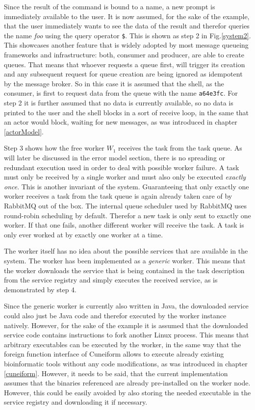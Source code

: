Since the result of the command is bound to a name, a new
prompt is immediately available to the user. It is now assumed,
for the sake of the example, that the user immediately wants to
see the data of the result and therefor queries the name
\textit{foo} using the query operator \texttt{\$}. This is
shown as step 2 in Fig.\ref{system2}. This showcases another
feature that is widely adopted by most message queueing
frameworks and infrastructure: both, consumer and producer,
are able to create queues. That means that whoever requests
a queue first, will trigger its creation and any subsequent
request for queue creation are being ignored as idempotent
by the message broker. So in this case it is assumed that
the shell, as the consumer, is first to request data from the
queue with the name \texttt{a64e3fc}. For step 2 it is further
assumed that no data is currently available, so no data is
printed to the user and the shell blocks in a sort of
receive loop, in the same that an actor would block, waiting
for new messages, as was introduced in chapter \ref{actorModel}.
\newline

Step 3 shows how the free worker $W_{1}$ receives the task from
the task queue. As will later be discussed in the error model
section, there is no spreading or redundant execution used in
order to deal with possible worker failure. A task must only
be received by a single worker and must also only be executed
\textit{exactly once}. This is another invariant of the system.
Guaranteeing that only exactly one worker receives a task
from the task queue is again already taken care of by RabbitMQ out
of the box. The internal queue scheduler used by RabbitMQ
uses round-robin scheduling by default. Therefor a new task
is only sent to exactly one worker. If that one fails, another
different worker will receive the task. A task is only ever
worked at by exactly one worker at a time.

The worker itself has no idea about the possible services
that are available in the system. The worker has been implemented
as a \textit{generic} worker. This means that the worker downloads
the service that is being contained in the task description from
the service registry and simply executes the received service, as
is demonstrated by step 4.

Since the generic worker is currently also written in Java,
the downloaded service could also just be Java code and therefor
executed by the worker instance natively. However, for the sake
of the example it is assumed that the downloaded service code
contains instructions to fork another Linux process. This means
that arbitrary executables can be executed by the worker, in
the same way that the foreign function interface of Cuneiform
allows to execute already existing bioinformatic tools without
any code modifications, as was introduced in chapter \ref{cuneiform}.
However, it needs to be said, that the current implementation
assumes that the binaries referenced are
already pre-installed on the worker node. However, this could be
easily avoided by also storing the needed executable in the service
registry and downloading it if necessary.
\newline

